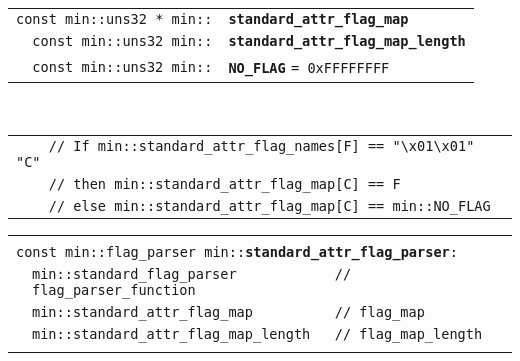\documentclass[12pt]{article}
\makeatletter
\newcommand{\TT}[1]{{\tt \bfseries #1}}
\newcommand{\ttindex}[1]{\index{#1@{\tt #1}}}
\newcommand{\EOL}{\penalty \exhyphenpenalty}
\newenvironment{indpar}[1][0.3in]%
	{\begin{list}{}%
		     {\setlength{\itemsep}{0in}%
		      \setlength{\topsep}{0in}%
		      \setlength{\parsep}{1ex}%
		      \setlength{\labelwidth}{#1}%
		      \setlength{\leftmargin}{#1}%
		      \addtolength{\leftmargin}{\labelsep}}%
	 \item}%
	{\end{list}}
\newcommand{\LABEL}[1]{\label{#1}}
\newlength{\ARGBREAKLENGTH}
\newcommand{\ARGBREAK}[1][\ARGBREAKLENGTH]{\\&\hspace*{#1}}
\newcommand{\MINKEY}[1]%
	   {\TT{#1}\ttindex{min::#1}\ttindex{#1}}
\newcommand{\MINLKEY}[2]%
           {\TT{#1#2}\index{min::#1@{\tt min::#1}!#2@{\tt #2}}%
                     \index{#1@{\tt #1}!#2@{\tt #2}}}
\makeatother
\begin{document}
\begin{indpar}[1em]\begin{tabular}{r@{}l}
\verb|const min::uns32 * min::| &
    \MINKEY{standard\_\EOL attr\_\EOL flag\_\EOL map}
\LABEL{MIN::STANDARD_ATTR_FLAG_MAP} \\
\verb|const min::uns32 min::| &
    \MINLKEY{standard\_\EOL attr\_\EOL flag}{\_\EOL map\_\EOL length}
\LABEL{MIN::STANDARD_ATTR_FLAG_MAP_LENGTH} \\
\verb|const min::uns32 min::| &
    \MINKEY{NO\_\EOL FLAG} \verb|= 0xFFFFFFFF|
\LABEL{MIN::NO_FLAG} \\
\end{tabular} \\
\begin{tabular}{l}
\verb|    // If min::standard_attr_flag_names[F] == "\x01\x01" "C"| \\
\verb|    // then min::standard_attr_flag_map[C] == F| \\
\verb|    // else min::standard_attr_flag_map[C] == min::NO_FLAG| \\
\end{tabular}\end{indpar}

\begin{tabular}{r@{}l}\hspace*{0.1in} \\[-3ex]
\multicolumn{2}{l}{\tt const min::flag\_parser
                   min::\MINKEY{standard\_attr\_flag\_parser}:}%
\LABEL{MIN::STANDARD_ATTR_FLAG_PARSER}\ARGBREAK
\verb|min::standard_flag_parser            // flag_parser_function|\ARGBREAK
\verb|min::standard_attr_flag_map          // flag_map|\ARGBREAK
\verb|min::standard_attr_flag_map_length   // flag_map_length|\ARGBREAK
\end{tabular}
\end{document}
